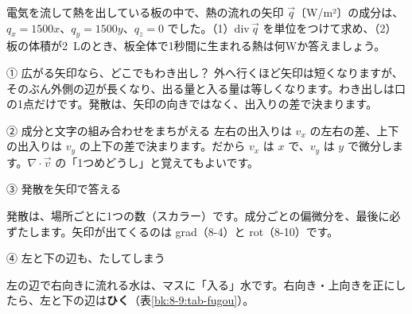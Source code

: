 \begin{jibun}
電気を流して熱を出している板の中で、熱の流れの矢印 $\vec q$〔W/m²〕の成分は、$q_x=1500x$、$q_y=1500y$、$q_z=0$ でした。（1）$\mathrm{div}\,\vec q$ を単位をつけて求め、（2）板の体積が\qty{2}{L}のとき、板全体で1秒間に生まれる熱は何Wか答えましょう。
\end{jibun}


\begin{tsumazuki}{① 広がる矢印なら、どこでもわき出し？}
外へ行くほど矢印は短くなりますが、そのぶん外側の辺が長くなり、出る量と入る量は等しくなります。わき出しは口の1点だけです。発散は、矢印の向きではなく、出入りの差で決まります。
\end{tsumazuki}

\begin{tsumazuki}{② 成分と文字の組み合わせをまちがえる}
左右の出入りは $v_x$ の左右の差、上下の出入りは $v_y$ の上下の差で決まります。だから $v_x$ は $x$ で、$v_y$ は $y$ で微分します。$\nabla\cdot\vec v$ の「1つめどうし」と覚えてもよいです。
\end{tsumazuki}

\begingroup{}%
\noindent\begin{minipage}[t]{0.485\linewidth}\vspace{0pt}
\begin{tsumazuki}{③ 発散を矢印で答える}
\raggedright{}
発散は、場所ごとに1つの数（スカラー）です。成分ごとの偏微分を、最後に必ずたします。矢印が出てくるのは grad（8-4）と rot（8-10）です。
\end{tsumazuki}
\end{minipage}\hfill
\begin{minipage}[t]{0.485\linewidth}\vspace{0pt}
\begin{tsumazuki}{④ 左と下の辺も、たしてしまう}
\raggedright{}
左の辺で右向きに流れる水は、マスに「入る」水です。右向き・上向きを正にしたら、左と下の辺は\textbf{ひく}（表\ref{bk:8-9:tab-fugou}）。
\end{tsumazuki}
\end{minipage}\par
\endgroup

